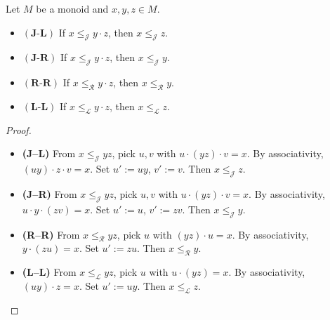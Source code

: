 \begin{lemma}
\label{lem:cancellation-all}
Let \(M\) be a monoid and \(x,y,z\in M\).
\begin{itemize}
  \item \(\mathbf{(J\text{-}L)}\) If \(x \le_{\mathcal J} y\cdot z\), then \(x \le_{\mathcal J} z\).
  \item \(\mathbf{(J\text{-}R)}\) If \(x \le_{\mathcal J} y\cdot z\), then \(x \le_{\mathcal J} y\).
  \item \(\mathbf{(R\text{-}R)}\) If \(x \le_{\mathcal R} y\cdot z\), then \(x \le_{\mathcal R} y\).
  \item \(\mathbf{(L\text{-}L)}\) If \(x \le_{\mathcal L} y\cdot z\), then \(x \le_{\mathcal L} z\).
\end{itemize}
\leanok
{}
\end{lemma}
\begin{proof}
\leanok
\begin{itemize}
  \item \textbf{(J–L)} From \(x \le_{\mathcal J} y z\), pick \(u,v\) with \(u\cdot (y z)\cdot v = x\). By associativity,
        \((u y)\cdot z\cdot v = x\). Set \(u':=u y\), \(v':=v\). Then \(x \le_{\mathcal J} z\).
  \item \textbf{(J–R)} From \(x \le_{\mathcal J} y z\), pick \(u,v\) with \(u\cdot (y z)\cdot v = x\). By associativity,
        \(u\cdot y\cdot (z v) = x\). Set \(u':=u\), \(v':=z v\). Then \(x \le_{\mathcal J} y\).
  \item \textbf{(R–R)} From \(x \le_{\mathcal R} y z\), pick \(u\) with \((y z)\cdot u = x\). By associativity,
        \(y\cdot (z u) = x\). Set \(u':=z u\). Then \(x \le_{\mathcal R} y\).
  \item \textbf{(L–L)} From \(x \le_{\mathcal L} y z\), pick \(u\) with \(u\cdot (y z) = x\). By associativity,
        \((u y)\cdot z = x\). Set \(u':=u y\). Then \(x \le_{\mathcal L} z\).
\end{itemize}
\end{proof}

